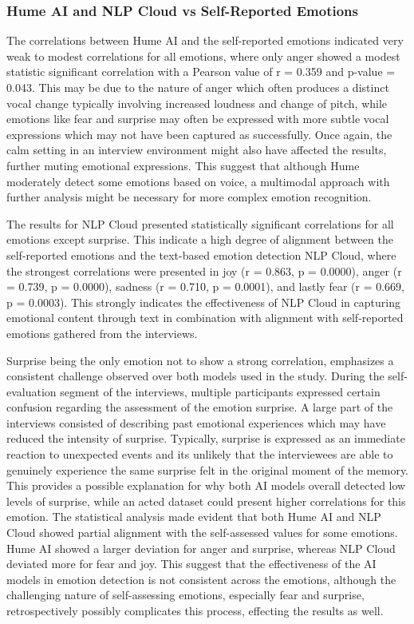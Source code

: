 \subsubsection{Hume AI and NLP Cloud vs Self-Reported Emotions}
The correlations between Hume AI and the self-reported emotions indicated very weak to modest correlations for all emotions, where only anger showed a modest statistic significant correlation with a Pearson value of r = 0.359 and p-value = 0.043. This may be due to the nature of anger which often produces a distinct vocal change typically involving increased loudness and change of pitch, while emotions like fear and surprise may often be expressed with more subtle vocal expressions which may not have been captured as successfully. Once again, the calm setting in an interview environment might also have affected the results, further muting emotional expressions. This suggest that although Hume moderately detect some emotions based on voice, a multimodal approach with further analysis might be necessary for more complex emotion recognition.

The results for NLP Cloud presented statistically significant correlations for all emotions except surprise. This indicate a high degree of alignment between the self-reported emotions and the text-based emotion detection NLP Cloud, where the strongest correlations were presented in joy (r = 0.863, p = 0.0000), anger (r = 0.739, p = 0.0000), sadness (r = 0.710, p = 0.0001), and lastly fear (r = 0.669, p = 0.0003).
This strongly indicates the effectiveness of NLP Cloud in capturing emotional content through text in combination with alignment with self-reported emotions gathered from the interviews. 

Surprise being the only emotion not to show a strong correlation, emphasizes a consistent challenge observed over both models used in the study. During the self-evaluation segment of the interviews, multiple participants expressed certain confusion regarding the assessment of the emotion surprise. A large part of the interviews consisted of describing past emotional experiences which may have reduced the intensity of surprise. Typically, surprise is expressed as an immediate reaction to unexpected events and its unlikely that the interviewees are able to genuinely experience the same surprise felt in the original moment of the memory. This provides a possible explanation for why both AI models overall detected low levels of surprise, while an acted dataset could present higher correlations for this emotion.
The statistical analysis made evident that both Hume AI and NLP Cloud showed partial alignment with the self-assessed values for some emotions. Hume AI showed a larger deviation for anger and surprise, whereas NLP Cloud deviated more for fear and joy. This suggest that the effectiveness of the AI models in emotion detection is not consistent across the emotions, although the challenging nature of self-assessing emotions, especially fear and surprise, retrospectively possibly complicates this process, effecting the results as well.



